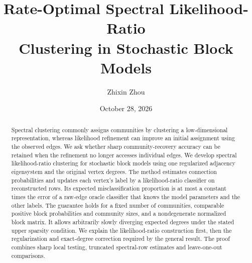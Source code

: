 \documentclass[11pt]{article}
\title{Rate-Optimal Spectral Likelihood-Ratio\\Clustering in Stochastic Block Models}
\author{Zhixin Zhou}
\date{October 28, 2026}
\theoremstyle{definition}
\theoremstyle{remark}
\begin{document}
\maketitle
\begin{abstract}
Spectral clustering commonly assigns communities by clustering a
low-dimensional representation, whereas likelihood refinement can
improve an initial assignment using the observed edges. We ask whether
sharp community-recovery accuracy can be retained when the refinement
no longer accesses individual edges. We develop spectral likelihood-ratio
clustering for stochastic block models using one regularized adjacency
eigensystem and the original vertex degrees. The method estimates connection
probabilities and updates each vertex's label by a likelihood-ratio
classifier on reconstructed rows. Its expected misclassification proportion
is at most a constant times the error of a raw-edge oracle classifier
that knows the model parameters and the other labels.
The guarantee holds for a fixed number of communities, comparable
positive block probabilities and community sizes, and a nondegenerate
normalized block matrix. It allows arbitrarily slowly diverging expected
degrees under the stated upper sparsity condition. We explain the
likelihood-ratio construction first, then the regularization and exact-degree
correction required by the general result. The proof combines sharp
local testing, truncated spectral-row estimates and leave-one-out
comparisons.
\end{abstract}


\clearpage
\appendix









\end{document}
